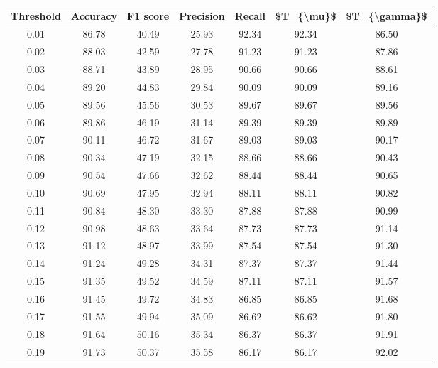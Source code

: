 \begin{tabular}{|c|c|c|c|c|c|c|}
\hline
 Threshold &  Accuracy &  F1 score &  Precision &  Recall &  \$T\_\{\textbackslash mu\}\$ &  \$T\_\{\textbackslash gamma\}\$ \\
\hline
      0.01 &     86.78 &     40.49 &      25.93 &   92.34 &      92.34 &         86.50 \\
      0.02 &     88.03 &     42.59 &      27.78 &   91.23 &      91.23 &         87.86 \\
      0.03 &     88.71 &     43.89 &      28.95 &   90.66 &      90.66 &         88.61 \\
      0.04 &     89.20 &     44.83 &      29.84 &   90.09 &      90.09 &         89.16 \\
      0.05 &     89.56 &     45.56 &      30.53 &   89.67 &      89.67 &         89.56 \\
      0.06 &     89.86 &     46.19 &      31.14 &   89.39 &      89.39 &         89.89 \\
      0.07 &     90.11 &     46.72 &      31.67 &   89.03 &      89.03 &         90.17 \\
      0.08 &     90.34 &     47.19 &      32.15 &   88.66 &      88.66 &         90.43 \\
      0.09 &     90.54 &     47.66 &      32.62 &   88.44 &      88.44 &         90.65 \\
      0.10 &     90.69 &     47.95 &      32.94 &   88.11 &      88.11 &         90.82 \\
      0.11 &     90.84 &     48.30 &      33.30 &   87.88 &      87.88 &         90.99 \\
      0.12 &     90.98 &     48.63 &      33.64 &   87.73 &      87.73 &         91.14 \\
      0.13 &     91.12 &     48.97 &      33.99 &   87.54 &      87.54 &         91.30 \\
      0.14 &     91.24 &     49.28 &      34.31 &   87.37 &      87.37 &         91.44 \\
      0.15 &     91.35 &     49.52 &      34.59 &   87.11 &      87.11 &         91.57 \\
      0.16 &     91.45 &     49.72 &      34.83 &   86.85 &      86.85 &         91.68 \\
      0.17 &     91.55 &     49.94 &      35.09 &   86.62 &      86.62 &         91.80 \\
      0.18 &     91.64 &     50.16 &      35.34 &   86.37 &      86.37 &         91.91 \\
      0.19 &     91.73 &     50.37 &      35.58 &   86.17 &      86.17 &         92.02 \\

\end{tabular}
